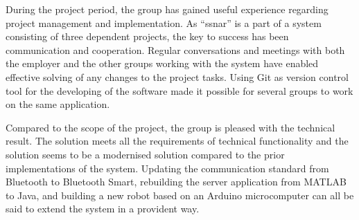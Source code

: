 During the project period, the group has gained useful experience regarding project management and implementation. As ``\acrlong{ssnar}'' is a part of a system consisting of three dependent projects, the key to success has been communication and cooperation. Regular conversations and meetings with both the employer and the other groups working with the system have enabled effective solving of any changes to the project tasks. Using Git as version control tool for the developing of the software made it possible for several groups to work on the same application.

Compared to the scope of the project, the group is pleased with the technical result. The solution meets all the requirements of technical functionality and the solution seems to be a modernised solution compared to the prior implementations of the system. Updating the communication standard from Bluetooth to Bluetooth Smart, rebuilding the server application from MATLAB to Java, and building a new robot based on an Arduino microcomputer can all be said to extend the system in a provident way.